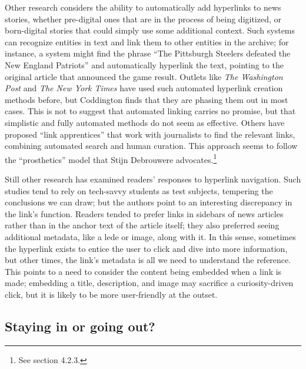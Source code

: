 Other research considers the ability to automatically add hyperlinks to news stories, whether pre-digital ones that are in the process of being digitized, or born-digital stories that could simply use some additional context.\autocite{arapakis_automatically_2014} Such systems can recognize entities in text and link them to other entities in the archive; for instance, a system might find the phrase ``The Pittsburgh Steelers defeated the New England Patriots'' and automatically hyperlink the text, pointing to the original article that announced the game result. Outlets like \emph{The Washington Post} and \emph{The New York Times} have used such automated hyperlink creation methods before, but Coddington finds that they are phasing them out in most cases.\autocite[148]{coddington_normalizing_2014} This is not to suggest that automated linking carries no promise, but that simplistic and fully automated methods do not seem as effective. Others have proposed ``link apprentices'' that work with journalists to find the relevant links, combining automated search and human curation.\autocite{bernstein_apprentice_1990} This approach seems to follow the ``prosthetics'' model that Stijn Debrouwere advocates.\footnote{See section 4.2.3.}

Still other research has examined readers' responses to hyperlink navigation. Such studies tend to rely on tech-savvy students as test subjects, tempering the conclusions we can draw; but the authors point to an interesting discrepancy in the link's function. Readers tended to prefer links in sidebars of news articles rather than in the anchor text of the article itself; they also preferred seeing additional metadata, like a lede or image, along with it.\autocites[See][]{eveland_user_2001}{tremayne_manipulating_2008} In this sense, sometimes the hyperlink exists to entice the user to click and dive into more information, but other times, the link's metadata is all we need to understand the reference. This points to a need to consider the content being embedded when a link is made; embedding a title, description, and image may sacrifice a curiosity-driven click, but it is likely to be more user-friendly at the outset.

\subsection{Staying in or going out?}

